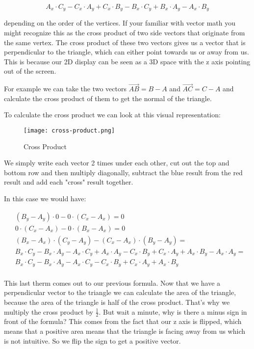 \documentclass[12pt]{report} \usepackage{preamble}
\begin{document}
\[A_x \cdot C_y - C_x \cdot A_y + C_x \cdot B_y - B_x \cdot C_y + B_x \cdot A_y - A_x \cdot B_y\]

depending on the order of the vertices. If your familiar with vector math you might recognize this as the cross product of two side vectors that originate from the same vertex.
The cross product of these two vectors gives us a vector that is perpendicular to the triangle, which can either point towards us or away from us.
This is because our 2D display can be seen as a 3D space with the z axis pointing out of the screen.

For example we can take the two vectors \(\vec{AB} = B - A\) and \(\vec{AC} = C - A\) and calculate the cross product of them to get the normal of the triangle.

To calculate the cross product we can look at this visual representation:

\begin{figure}[hbtp]
	\centering
	\texttt{[image: cross-product.png]}
	\caption{Cross Product} \FloatBarrier
\end{figure}

We simply write each vector 2 times under each other, cut out the top and bottom row and then multiply diagonally, subtract the blue result from the red result
and add each "cross" result together.

In this case we would have:

\[
	\begin{aligned}
		 & (B_y - A_y) \cdot 0 - 0 \cdot (C_x - A_x) = 0                                                                                    \\
		 & 0 \cdot (C_x - A_x) - 0 \cdot (B_x - A_x) = 0                                                                                    \\
		 & (B_x - A_x) \cdot (C_y - A_y) - (C_x - A_x) \cdot (B_y - A_y) =                                                                  \\
		 & B_x \cdot C_y - B_x \cdot A_y - A_x \cdot C_y + A_x \cdot A_y - C_x \cdot B_y + C_x \cdot A_y + A_x \cdot B_y - A_x \cdot A_y  = \\
		 & B_x \cdot C_y - B_x \cdot A_y - A_x \cdot C_y - C_x \cdot B_y + C_x \cdot A_y + A_x \cdot B_y                                    \\
	\end{aligned}
\]

This last therm comes out to our previous formula.
Now that we have a perpendicular vector to the triangle we can calculate the area of the triangle, because the area of the triangle is half of
the cross product. That's why we multiply the cross product by \(\frac{1}{2}\). But wait a minute, why is there a minus sign in front of the formula?
This comes from the fact that our z axis is flipped, which means that a positive area means that the triangle is facing away from us which is not
intuitive. So we flip the sign to get a positive vector.
\end{document}
